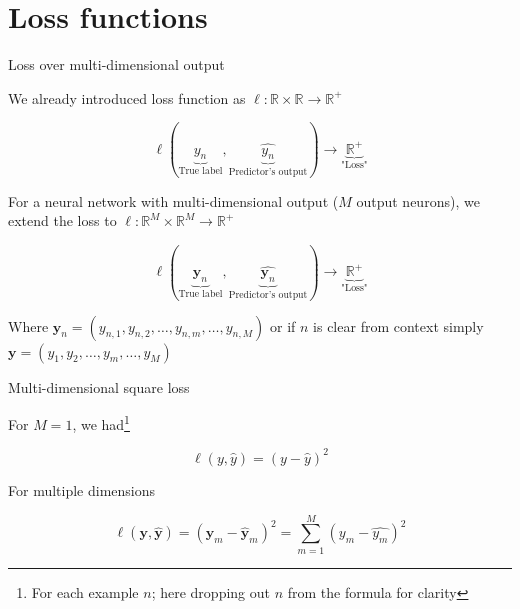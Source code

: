 \documentclass[12pt]{beamer}
\begin{document}
\section{Loss functions}


\begin{frame}{Loss over multi-dimensional output}

We already introduced loss function as  $\ell : \mathbb{R} \times \mathbb{R} \to \mathbb{R}^+$

$$
\ell(\underbrace{y_n}_{\text{True label}}, \underbrace{\hat{y_n}}_{\text{Predictor's output}}) \to \underbrace{\mathbb{R}^{+}}_{\text{"Loss"}}
$$

For a neural network with multi-dimensional output ($M$ output neurons), we extend the loss to $\ell : \mathbb{R}^M \times \mathbb{R}^M \to \mathbb{R}^+$


$$
\ell(\underbrace{\mathbf{y}_n}_{\text{True label}}, \underbrace{\hat{\mathbf{y}_n}}_{\text{Predictor's output}}) \to \underbrace{\mathbb{R}^{+}}_{\text{"Loss"}}
$$

Where $\mathbf{y}_n = (y_{n,1}, y_{n, 2}, \dots, y_{n,m}, \dots, y_{n,M})$ or if $n$ is clear from context simply $\mathbf{y} = (y_{1}, y_{2}, \dots, y_{m}, \dots, y_{M})$



\end{frame}


\begin{frame}{Multi-dimensional square loss}

For $M = 1$, we had\footnote{For each example $n$; here dropping out $n$ from the formula for clarity}

$$
\ell(y, \hat{y}) = (y - \hat{y})^2
$$

For multiple dimensions

$$
\ell(\mathbf{y}, \hat{\mathbf{y}}) =  (\mathbf{y}_m - \hat{\mathbf{y}}_m)^2 = \sum_{m = 1}^{M} (y_m - \hat{y_m})^2
$$


\end{frame}
\end{document}
